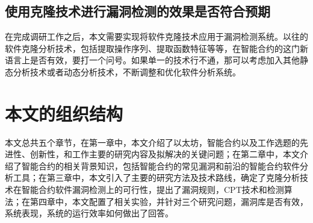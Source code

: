 \subsection{使用克隆技术进行漏洞检测的效果是否符合预期}

在完成调研工作之后，本文需要实现将软件克隆技术应用于漏洞检测系统。以往的软件克隆分析技术，包括提取操作序列、提取函数特征等等，在智能合约的这门新语言上是否有效，要打一个问号。如果单一的技术行不通，那可以考虑加入其他静态分析技术或者动态分析技术，不断调整和优化软件分析系统。

\section{本文的组织结构}

本文总共五个章节，在第一章中，本文介绍了以太坊，智能合约以及工作选题的先进性、创新性，和工作主要的研究内容及拟解决的关键问题；在第二章中，本文介绍了智能合约的相关背景知识，包括智能合约的常见漏洞和前沿的智能合约软件分析工具；在第三章中，本文引入了主要的研究方法及技术路线，确定了克隆分析技术在智能合约软件漏洞检测上的可行性，提出了漏洞规则，CPT技术和检测算法；在第四章中，本文配置了相关实验，并针对三个研究问题，漏洞库是否有效，系统表现，系统的运行效率如何做出了回答。